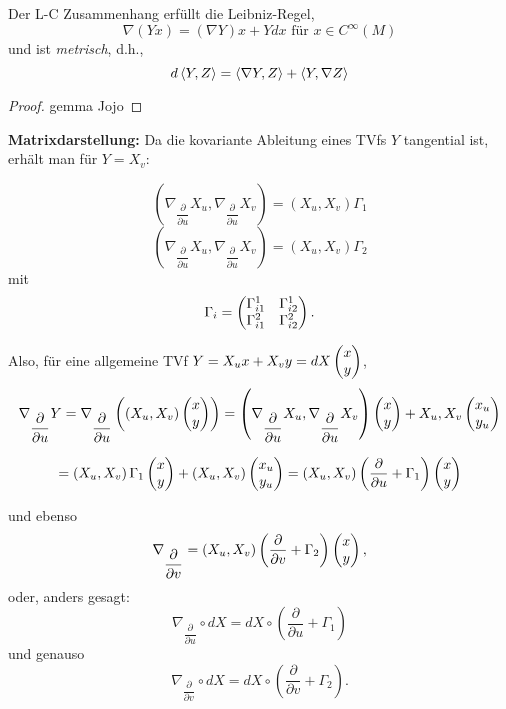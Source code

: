 \begin{lemma}
	
	Der L-C Zusammenhang erfüllt die Leibniz-Regel,
		\[ \nabla(Yx) = (\nabla Y)x + Ydx \text{ für } x \in C^\infty(M) \] 
	und ist \emph{metrisch}, d.h., 
		\[ d\left \langle Y,Z \right\rangle = \left \langle \nabla Y,Z \right\rangle + \left \langle Y,\nabla Z \right\rangle \]
	
\end{lemma}

\begin{proof}
	
	gemma Jojo
	
\end{proof}

\textbf{Matrixdarstellung:} Da die kovariante Ableitung eines TVfs $ Y $ tangential ist, erhält man für $ Y = X_v :$

		\[ \left(\nabla_{\dfrac{\partial}{\partial u}}X_u,\nabla_{\dfrac{\partial}{\partial u}}X_v \right) = (X_u,X_v)\Gamma_1 \] 
		\[ \left(\nabla_{\dfrac{\partial}{\partial u}}X_u,\nabla_{\dfrac{\partial}{\partial u}}X_v \right) = (X_u,X_v)\Gamma_2 \] 
	mit 
		\[ \Gamma_i = \begin{pmatrix} \Gamma_{i1}^1 & \Gamma_{i2}^1 \\ \Gamma_{i1}^2 & \Gamma_{i2}^2 \end{pmatrix}. \]
		
	Also, für eine allgemeine TVf $ Y=X_ux+X_vy=dX\begin{pmatrix} x \\ y \end{pmatrix} $, 
		\[ \nabla_{\dfrac{\partial}{\partial u}}Y= \nabla_{\dfrac{\partial}{\partial u}}\left ( \left( X_u,X_v \right) \begin{pmatrix} x \\y \end{pmatrix}    \right ) = \left( \nabla_{\dfrac{\partial}{\partial u}}X_u,\nabla_{\dfrac{\partial}{\partial u}}X_v \right) \begin{pmatrix} x \\y \end{pmatrix} + X_u,X_v \begin{pmatrix} x_u \\ y_u \end{pmatrix} \]

		\[ = \left( X_u, X_v \right) \Gamma_1\begin{pmatrix} x \\ y \end{pmatrix} + \left( X_u, X_v \right) \begin{pmatrix} x_u \\ y_u \end{pmatrix} = \left( X_u, X_v \right) \left( \dfrac{\partial}{\partial u} +\Gamma_1 \right) \begin{pmatrix} x \\ y \end{pmatrix}    \]
		
	und ebenso 
		\[ \nabla_{\dfrac{\partial}{\partial v}} = \left( X_u, X_v \right) \left( \dfrac{\partial}{\partial v} +\Gamma_2 \right) \begin{pmatrix} x \\ y \end{pmatrix},  \] 
	oder, anders gesagt:
		\[ \nabla_{\dfrac{\partial}{\partial u}} \circ dX = dX \circ \left( \dfrac{\partial}{\partial u} + \Gamma_1 \right)  \]
	und genauso
		\[  \nabla_{\dfrac{\partial}{\partial v}} \circ dX = dX \circ \left( \dfrac{\partial}{\partial v} + \Gamma_2 \right).   \]	
	

